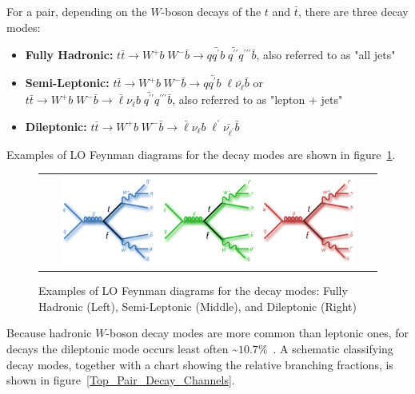 For a \ttbar pair, depending on the $W$-boson decays of the $t$ and $\bar{t}$, there are three decay modes: 
\begin{itemize}
    \item {\bf Fully Hadronic:} $t\bar{t} \rightarrow W^+ b \; W^- \bar{b} \rightarrow q \bar{q^\prime} b \; \bar{q^{\prime\prime}}  q^{\prime\prime\prime} \bar{b}$, also referred to as "all jets"
    \item {\bf Semi-Leptonic:} $t\bar{t} \rightarrow W^+ b \; W^- \bar{b} \rightarrow  q \bar{q^\prime} b \; \ell \bar{\nu_{\ell}} \bar{b} $ or $t\bar{t} \rightarrow W^+ b \; W^- \bar{b} \rightarrow  \bar{\ell} \nu_\ell b \; \bar{q^{\prime\prime}}  q^{\prime\prime\prime} \bar{b}$, also referred to as "lepton + jets"
    \item {\bf Dileptonic:} $t\bar{t} \rightarrow W^+ b \; W^- \bar{b} \rightarrow \bar{\ell} \nu_\ell b \; \ell^{\prime} \bar{\nu_{\ell^{\prime}}} \bar{b}$
\end{itemize}
Examples of LO Feynman diagrams for the \ttbar decay modes are shown in figure~\ref{Top_Pair_Decay_FeynmanDiagrams}.
\begin{figure}[htb]
  \begin{center}
    \begin{tabular}{c}
        \includegraphics[width=0.90\textwidth]{fig_TopQuark/ttbar_decay_feynman_diagrams.png}
    \end{tabular}
    \caption{Examples of LO Feynman diagrams for the \ttbar decay modes: Fully Hadronic (Left), Semi-Leptonic (Middle), and Dileptonic (Right)~\cite{d0_diagrams}
            }
    \label{Top_Pair_Decay_FeynmanDiagrams}
  \end{center}
\end{figure}
Because hadronic $W$-boson decay modes are more common than leptonic ones, for \ttbar decays the dileptonic mode occurs least often \sim$10.7 \%$~\cite{bib:PDG}.
A schematic classifying \ttbar decay modes, together with a chart showing the relative branching fractions, is shown in figure~\ref{Top_Pair_Decay_Channels}.
